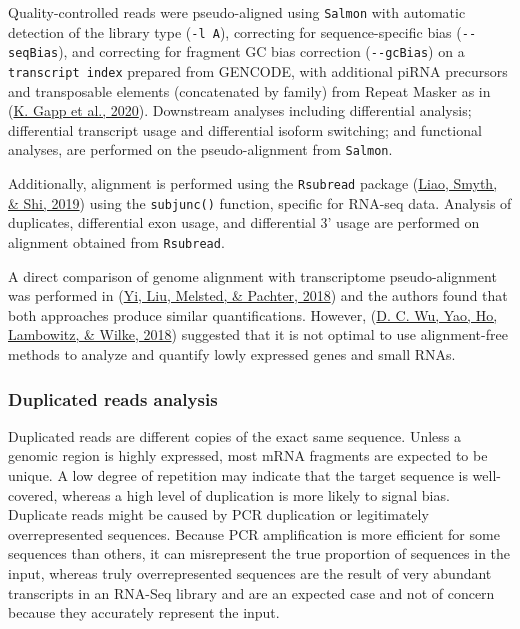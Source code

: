 \documentclass[12pt,twoside]{reedthesis}
\begin{document}
Quality-controlled reads were pseudo-aligned using \texttt{Salmon} with automatic
detection of the library type (\texttt{-l\ A}), correcting for sequence-specific
bias (\texttt{-\/-seqBias}), and correcting for fragment GC bias correction
(\texttt{-\/-gcBias}) on a \texttt{transcript\ index} prepared from GENCODE, with additional
piRNA precursors and transposable elements (concatenated by family) from
Repeat Masker as in (\protect\hyperlink{ref-gapp2020}{K. Gapp et al., 2020}). Downstream analyses including
differential analysis; differential transcript usage and
differential isoform switching; and functional analyses, are performed on the pseudo-alignment from \texttt{Salmon}.

Additionally, alignment is performed using the \texttt{Rsubread} package
(\protect\hyperlink{ref-liao2019}{Liao, Smyth, \& Shi, 2019}) using the \texttt{subjunc()} function, specific for RNA-seq data.
Analysis of duplicates, differential exon usage, and differential 3' usage are performed on
alignment obtained from \texttt{Rsubread}.

A direct comparison of genome alignment with transcriptome
pseudo-alignment was performed in (\protect\hyperlink{ref-yi2018}{Yi, Liu, Melsted, \& Pachter, 2018}) and the authors found that
both approaches produce similar quantifications. However, (\protect\hyperlink{ref-wu2018}{D. C. Wu, Yao, Ho, Lambowitz, \& Wilke, 2018})
suggested that it is not optimal to use alignment-free methods to
analyze and quantify lowly expressed genes and small RNAs.

\hypertarget{m3.2.2}{%
\subsubsection*{Duplicated reads analysis}\label{m3.2.2}}

Duplicated reads are different copies of the exact same sequence. Unless
a genomic region is highly expressed, most mRNA fragments are expected
to be unique. A low degree of repetition may indicate that the target
sequence is well-covered, whereas a high level of duplication is more
likely to signal bias. Duplicate reads might be caused by PCR
duplication or legitimately overrepresented sequences. Because PCR
amplification is more efficient for some sequences than others, it can
misrepresent the true proportion of sequences in the input, whereas
truly overrepresented sequences are the result of very abundant
transcripts in an RNA-Seq library and are an expected case and not of
concern because they accurately represent the input.
\end{document}
